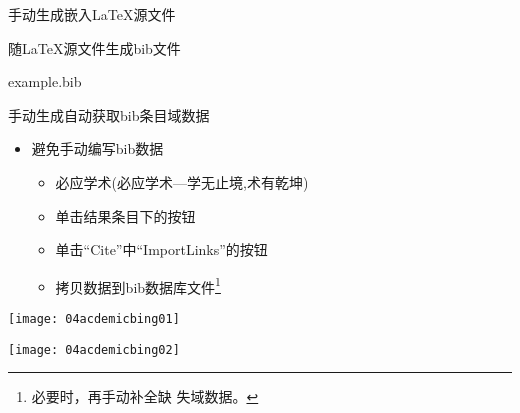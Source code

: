 \documentclass[fontset = none, t]{ctexbeamer}
\begin{document}
\begin{frame}[fragile]{手动生成}{嵌入\LaTeX 源文件}
\begin{spacing}{1.3}
\begin{center}
\begin{minipage}[h]{0.55\linewidth}
\begin{textcb}{随\LaTeX 源文件生成bib文件}
\begin{filecontents}{example.bib}
\begin{frame}[fragile]{手动生成}{自动获取bib条目域数据}
  \begin{spacing}{1.5}
    \begin{itemize}
    \item 避免手动编写bib数据
      \begin{itemize}
      \item 必应学术(必应学术---学无止境,术有乾坤)
      \item 单击结果条目下的\alert{}按钮
      \item 单击\enquote{Cite}中\enquote{ImportLinks}的\alert{}按钮
      \item 拷贝数据到bib数据库文件\footnote[frame,2]{必要时，再手动补全缺
          失域数据。}
      \end{itemize}
    \end{itemize}    
    \begin{center}
      \begin{annotatedFigure}
        {\texttt{[image: 04acdemicbing01]}}
      \end{annotatedFigure}\quad
      \begin{annotatedFigure}
        {\texttt{[image: 04acdemicbing02]}}
      \end{annotatedFigure}
    \end{center}
  \end{spacing}
\end{frame}


\end{filecontents}
\end{textcb}
\end{minipage}
\end{center}
\end{spacing}
\end{frame}
\end{document}
